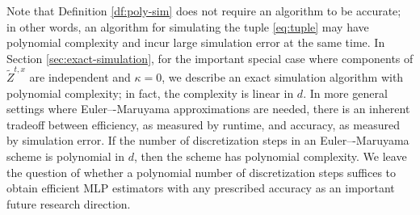 \documentclass[11pt]{article}
\theoremstyle{definition}
\theoremstyle{plain}
\begin{document}
Note that Definition \ref{df:poly-sim} does not require an algorithm to be accurate; in other words,  
an algorithm for simulating the tuple \eqref{eq:tuple} may have polynomial complexity and incur large simulation error at the same time. 
In Section \ref{sec:exact-simulation}, for the important special case 
where components of $\tilde Z^{t,x}$ are independent and $\kappa = 0$, 
we describe an exact simulation algorithm with polynomial complexity; in fact, the complexity is linear in $d$. 
In more general settings where Euler–-Maruyama approximations are needed, there is an inherent tradeoff between efficiency, 
as measured by runtime, and accuracy, as measured by simulation error. 
If the number of discretization steps in an Euler–-Maruyama scheme is polynomial in $d$, then the scheme has polynomial complexity. 
We leave the question of whether a polynomial number of discretization steps suffices to obtain 
efficient MLP estimators with any prescribed accuracy as an important future research direction. 


 
\end{document}
